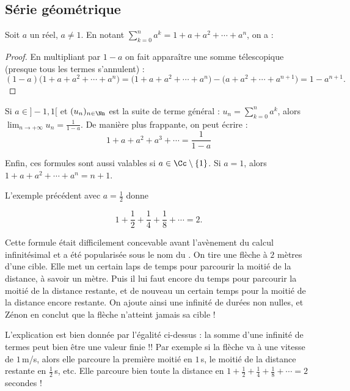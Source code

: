 \documentclass[class=report,crop=false]{standalone}
\begin{document}
\subsection{Série géométrique}

\begin{proposition}
  Soit $a$ un réel, $a\neq 1$. En notant $\sum_{k=0}^na^k=1+a+a^2+\cdots+a^n$, on a :

\end{proposition}

\begin{proof}
En multipliant par $1-a$ on fait apparaître une somme télescopique
(presque tous les termes s'annulent) :
  \[(1-a)\big(1+a+a^2+\cdots+a^n \big)=
  \big(1+a+a^2+\cdots+a^n \big) - \big(a+a^2+\cdots+a^{n+1} \big)=1-a^{n+1} .\]
\end{proof}

\begin{remarque*}
Si $a\in ]-1,1[$ et $(u_n)_{n\in \Nn}$ est la suite de terme général :
$u_n= \sum_{k=0}^na^k$, alors $\lim_{n\to +\infty} u_n= \frac{1}{1-a}$.
De manière plus frappante, on peut écrire :
\[1+a+a^2+a^3 +\cdots = \frac{1}{1-a}\]

Enfin, ces formules sont aussi valables si $a\in \Cc\setminus\{1\}$.
Si $a=1$, alors $1+a+a^2+\cdots+a^n=n+1$.
\end{remarque*}

\begin{exemple}
L'exemple précédent avec $a=\frac{1}{2}$ donne

  \[1+\frac{1}{2} +\frac{1}{4} +\frac{1}{8} +\cdots = 2 .\]

Cette formule était difficilement concevable avant l’avènement du calcul infinitésimal et a été
popularisée sous le nom du . On tire une flèche à $2$ mètres d'une cible.
Elle met un certain laps de temps pour parcourir
la moitié de la distance, à savoir un mètre. Puis il lui faut encore du
temps pour parcourir la moitié de la distance restante, et de nouveau un
certain temps pour la moitié de la distance encore restante.
On ajoute ainsi une infinité de durées non nulles, et Zénon en conclut
que la flèche n'atteint jamais sa cible !

L'explication est bien donnée par l'égalité ci-dessus :
la somme d'une infinité de termes peut bien être une valeur finie !!
Par exemple si la flèche va à une vitesse de $1$\,m/s, alors
elle parcoure la première moitié en $1$\,s, le moitié de la distance restante en $\frac12$\,s, etc.
Elle parcoure bien toute la distance en $1+\frac{1}{2} +\frac{1}{4} +\frac{1}{8} +\cdots = 2$ secondes !

\end{exemple}
\end{document}
